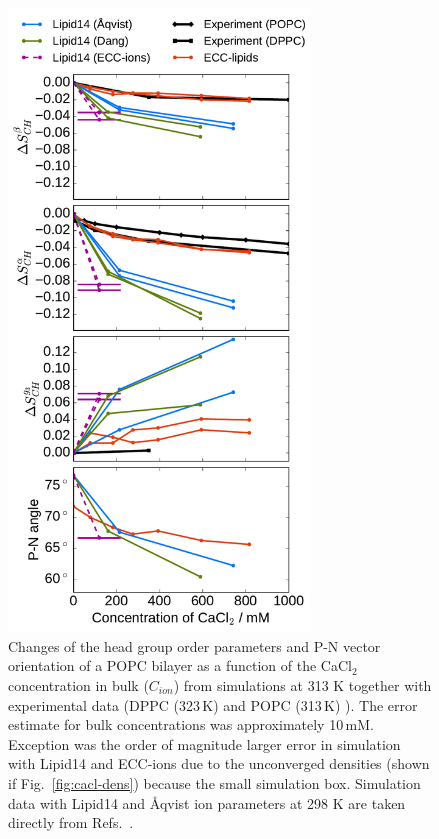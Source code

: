 \documentclass[aip,jcp,twocolumn]{revtex4}
\begin{document}
\begin{figure}[htb!]
  \centering
  \includegraphics[width=8.0cm]{../Fig/ipython_nb/PN_angle_OrdPars-A-B-g3_L14-ECCL17_q80_sig89_CaCl.pdf}
  \caption{\label{fig:delta_ordPar_CaCl}
    Changes of the head group order parameters and P-N vector orientation of a POPC bilayer 
    as a function of the CaCl$_2$ concentration in bulk ($C_{ion}$)
    from simulations at 313 K together with experimental data 
    (DPPC (323\,K) \cite{akutsu81} and POPC (313\,K) \cite{altenbach84}). 
    The error estimate for bulk concentrations was approximately 10\,mM.
    Exception was the order of magnitude larger error in
    simulation with Lipid14 and ECC-ions due to the unconverged densities  (shown if Fig.~\ref{fig:cacl-dens}) because the 
    small simulation box. 
    Simulation data with Lipid14 and \AA{}qvist ion parameters at 298 K are taken directly from
    Refs.~\cite{lipid14POPC0mMNaClfiles,lipid14POPC350mMCaClfiles,lipid14POPC350mMCaClfilesNC}.
  }
\end{figure}
\end{document}
